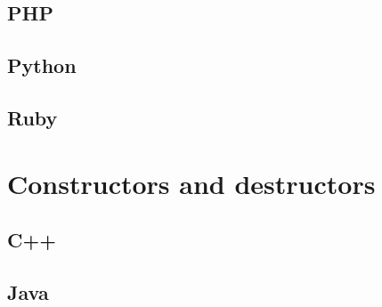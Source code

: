 \documentclass{KodeBook}
\begin{document}


\subsection{PHP}



\subsection{Python}



\subsection{Ruby}




\section{Constructors and destructors}

\subsection{C++}







\subsection{Java}






\end{document}

